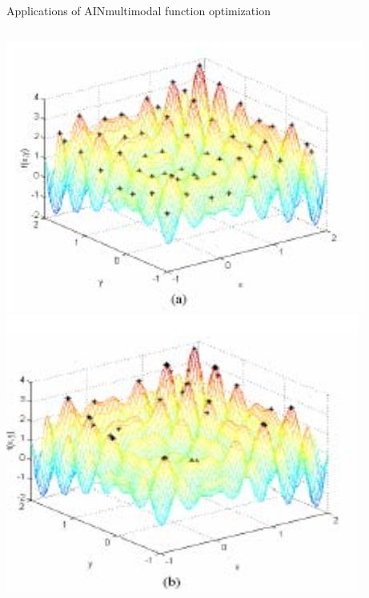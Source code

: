 \begin{frame}{Applications of AIN}{multimodal function optimization}
\begin{columns}[c] 
\includegraphics[scale=0.6]{img/multimodal_function_optimization_AIN.JPG}
\includegraphics[scale=0.6]{img/multimodal_function_optimization_clonalg.JPG}
\end{columns}
\end{frame}

